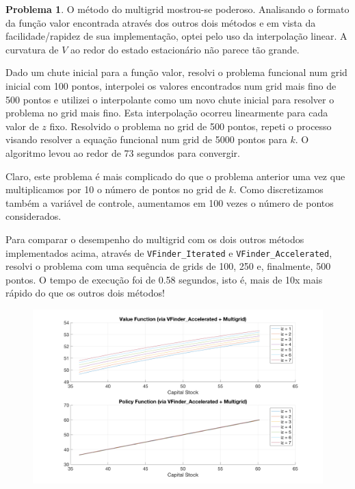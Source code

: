 \documentclass[11pt]{article}
\theoremstyle{definition}
\theoremstyle{definition}
\newtheorem{problema}{Problema}
\theoremstyle{solution}
\begin{document}
	
\begin{problema}
	O método do multigrid mostrou-se poderoso. Analisando o formato da função valor encontrada através dos outros dois métodos e em vista da facilidade/rapidez de sua implementação, optei pelo uso da interpolação linear. A curvatura de $V$ ao redor do estado estacionário não parece tão grande.
	
	Dado um chute inicial para a função valor, resolvi o problema funcional num grid inicial com 100 pontos, interpolei os valores encontrados num grid mais fino de 500 pontos e utilizei o interpolante como um novo chute inicial para resolver o problema no grid mais fino. Esta interpolação ocorreu linearmente para cada valor de $z$ fixo. Resolvido o problema no grid de 500 pontos, repeti o processo visando resolver a equação funcional num grid de 5000 pontos para $k$. O algoritmo levou ao redor de 73 segundos para convergir.
		
	Claro, este problema é mais complicado do que o problema anterior uma vez que multiplicamos por 10 o número de pontos no grid de $k$. Como discretizamos também a variável de controle, aumentamos em 100 vezes o número de pontos considerados. 
	
	Para comparar o desempenho do multigrid com os dois outros métodos implementados acima, através de \texttt{VFinder\_Iterated} e \texttt{VFinder\_Accelerated}, resolvi o problema com uma sequência de grids de 100, 250 e, finalmente, 500 pontos. O tempo de execução foi de 0.58 segundos, isto é, mais de 10x mais rápido do que os outros dois métodos!
	\begin{figure}[h!]
		\centering
		\includegraphics[scale = 0.22]{multigrid}
	\end{figure}
\end{problema}
	
\end{document}
